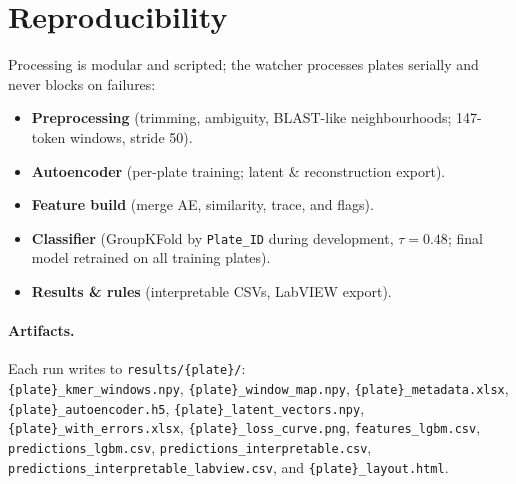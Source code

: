 \section{Reproducibility}
\label{sec:repro}
Processing is modular and scripted; the watcher processes plates serially and never blocks on failures:
\begin{itemize}
  \item \textbf{Preprocessing} (trimming, ambiguity, BLAST-like neighbourhoods; 147-token windows, stride 50).
  \item \textbf{Autoencoder} (per-plate training; latent \& reconstruction export).
  \item \textbf{Feature build} (merge AE, similarity, trace, and flags).
  \item \textbf{Classifier} (GroupKFold by \texttt{Plate\_ID} during development, $\tau=0.48$; final model retrained on all training plates).
  \item \textbf{Results \& rules} (interpretable CSVs, LabVIEW export).
\end{itemize}
\paragraph{Artifacts.} Each run writes to \texttt{results/\{plate\}/}:\\
\texttt{\{plate\}\_kmer\_windows.npy}, \texttt{\{plate\}\_window\_map.npy}, \texttt{\{plate\}\_metadata.xlsx}, \texttt{\{plate\}\_autoencoder.h5}, \texttt{\{plate\}\_latent\_vectors.npy}, \texttt{\{plate\}\_with\_errors.xlsx}, \texttt{\{plate\}\_loss\_curve.png}, \texttt{features\_lgbm.csv}, \texttt{predictions\_lgbm.csv}, \texttt{predictions\_interpretable.csv}, \texttt{predictions\_interpretable\_labview.csv}, and \texttt{\{plate\}\_layout.html}.
